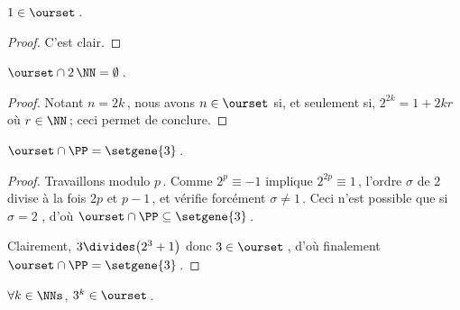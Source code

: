 \begin{fact}
	$1 \in \ourset$\,.
\end{fact}

\begin{proof}
	C'est clair.
\end{proof}




\begin{fact} \label{no-even}
	$\ourset \cap 2\,\NN = \emptyset$\,.
\end{fact}

\begin{proof}
	Notant $n = 2 k$\,, nous avons $n \in \ourset$ si, et seulement si, $2^{2 k} = 1 + 2 k r$ où $r \in \NN$\,; ceci permet de conclure.
\end{proof}




\begin{fact} \label{prime-sol}
	$\ourset \cap \PP = \setgene{3}$\,.
\end{fact}

\begin{proof}
	Travaillons modulo $p$\,.
	Comme $2^p \equiv - 1$
	implique
	$2^{2p} \equiv 1$\,,
	l'ordre $\sigma$ de $2$ divise à la fois $2p$ et $p-1$\,, et vérifie forcément $\sigma \neq 1$\,.
	Ceci n'est possible que si $\sigma = 2$ , d'où $\ourset \cap \PP \subseteq \setgene{3}$\,.
	
	\medskip
	
	Clairement, $3 \divides \big( 2^3 + 1 \big)$ donc $3 \in \ourset$\,, d'où finalement $\ourset \cap \PP = \setgene{3}$\,.
\end{proof}




\begin{fact} \label{power-of-3}
	$\forall k \in \NNs$, $3^k \in \ourset$\,.
\end{fact}

